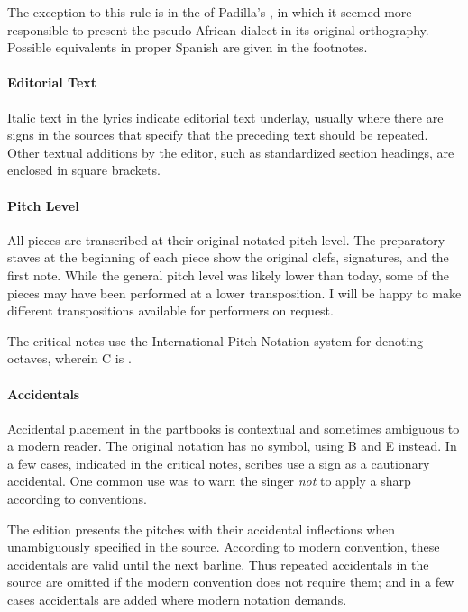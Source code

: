 The exception to this rule is in the  of Padilla's , in which it seemed more responsible to present the 
pseudo-African dialect in its original orthography.
Possible equivalents in proper Spanish are given in the footnotes.

\paragraph{Editorial Text}
Italic text in the lyrics indicate editorial text underlay, usually where there 
are \MSrepeat{} signs in the sources that specify that the preceding text should
be repeated.
Other textual additions by the editor, such as standardized section headings, 
are enclosed in square brackets.

\paragraph{Pitch Level}
All pieces are transcribed at their original notated pitch level.
The preparatory staves at the beginning of each piece show the original clefs, 
signatures, and the first note.
While the  general pitch level was likely lower than today, some of the pieces 
may have been performed at a lower transposition.
I will be happy to make different transpositions available for performers on 
request.

The critical notes use the International Pitch Notation system for denoting 
octaves, wherein C is .



\paragraph{Accidentals}
Accidental placement in the partbooks is contextual and sometimes ambiguous to 
a modern reader.
The original notation has no \na{} symbol, using B\sh{} and E\sh{} instead.
In a few cases, indicated in the critical notes, scribes use a \sh{} sign as a 
cautionary accidental.
One common use was to warn the singer \emph{not} to apply a sharp according 
to  conventions.%
  \autocites{Harran:Cautionary1}{Harran:Cautionary2}

The edition presents the pitches with their accidental inflections when 
unambiguously specified in the source.
According to modern convention, these accidentals are valid until the next 
barline.
Thus repeated accidentals in the source are omitted if the modern convention 
does not require them; and in a few cases accidentals are added where modern 
notation demands.

